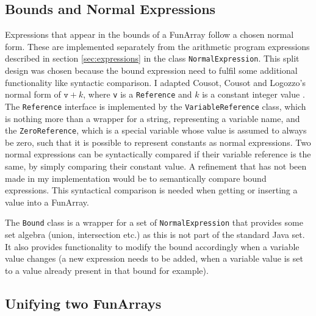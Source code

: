 \subsection{Bounds and Normal Expressions}

Expressions that appear in the bounds of a FunArray follow a chosen normal form. These are implemented separately from the arithmetic program expressions described in section \ref{sec:expressions} in the class \texttt{NormalExpression}. This split design was chosen because the bound expression need to fulfil some additional functionality like syntactic comparison. I adapted Cousot, Cousot and Logozzo's normal form of $\mathtt{v}+k$, where \texttt{v} is a \texttt{Reference} and $k$ is a constant integer value \cite{cousot2011}. The \texttt{Reference} interface is implemented by the \texttt{VariableReference} class, which is nothing more than a wrapper for a string, representing a variable name, and the \texttt{ZeroReference}, which is a special variable whose value is assumed to always be zero, such that it is possible to represent constants as normal expressions. Two normal expressions can be syntactically compared if their variable reference is the same, by simply comparing their constant value. A refinement that has not been made in my implementation would be to semantically compare bound expressions. This syntactical comparison is needed when getting or inserting a value into a FunArray.

The \texttt{Bound} class is a wrapper for a set of \texttt{NormalExpression} that provides some set algebra (union, intersection etc.) as this is not part of the standard Java set. It also provides functionality to modify the bound accordingly when a variable value changes (a new expression needs to be added, when a variable value is set to a value already present in that bound for example).

\subsection{Unifying two FunArrays}\label{sec:funarray:unifying}

